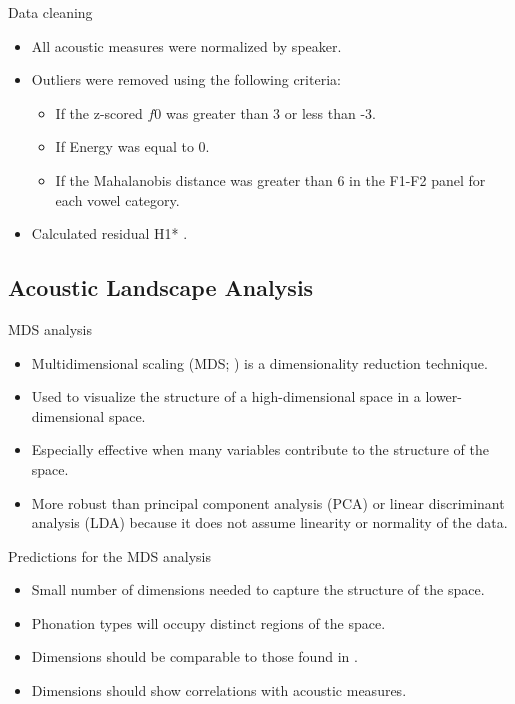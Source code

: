 \documentclass[professionalfonts]{beamer}
\begin{document}
\begin{frame}{Data cleaning}
  \begin{itemize}
    \item All acoustic measures were normalized by speaker.
    \item Outliers were removed using the following criteria:
    \begin{itemize}
      \item If the z-scored $f0$ was greater than 3 or less than -3.
      \item If Energy was equal to 0.
      \item If the Mahalanobis distance was greater than 6 in the F1-F2 panel for each vowel category.
    \end{itemize}
    \item Calculated residual H1* \citep{chaiH1H2AcousticMeasure2022}.
  \end{itemize}
\end{frame}

\subsection{Acoustic Landscape Analysis}

\begin{frame}{MDS analysis}
  \begin{itemize}
    \item Multidimensional scaling (MDS; \cite{kruskalMultidimensionalScaling1978}) is a dimensionality reduction technique.
    \item Used to visualize the structure of a high-dimensional space in a lower-dimensional space.
    \item Especially effective when many variables contribute to the structure of the space.
    \item More robust than principal component analysis (PCA) or linear discriminant analysis (LDA) because it does not assume linearity or normality of the data.
  \end{itemize}
\end{frame}

\begin{frame}{Predictions for the MDS analysis}
  \begin{itemize}
    \item Small number of dimensions needed to capture the structure of the space.
    \item Phonation types will occupy distinct regions of the space.
    \item Dimensions should be comparable to those found in \citet{keatingCrosslanguageAcousticSpace2023}.
    \item Dimensions should show correlations with acoustic measures.
  \end{itemize}
\end{frame}
\end{document}
